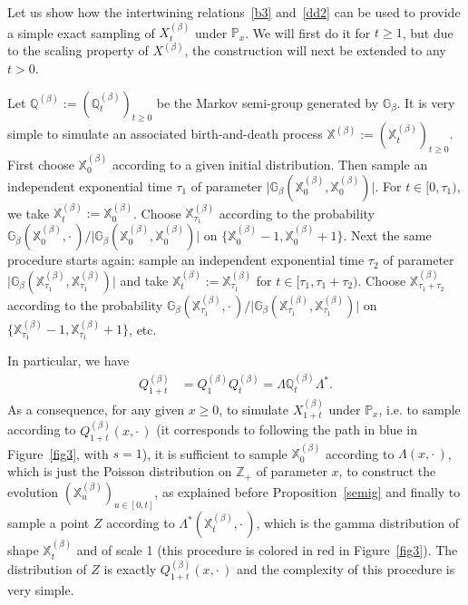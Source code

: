 \documentclass[AHL,Unicode,longabstracts]{cedram}
\newcommand{\df}{\mathrel{:=}}
\newcommand{\cX}{{\discret X}}
\newcommand{\PP}{\mathbb{P}}
\newcommand{\ZZ}{\mathbb{Z}}
\newcommand{\dBg}{{\discret{G}}}
\newcommand{\dBs}{{\discret{Q}}}
\newcommand{\Bs}{Q}
\newcommand{\discret}[1]{\mathds{#1}}
\newcommand{\adjL}{\Lambda^*}
\begin{document}
Let us show how the intertwining relations~\eqref{b3} and~\eqref{dd2} can be used to provide a simple exact sampling of $X^{(\beta)}_t$ under $\PP_x$. We will first do it for $t\geq 1$, but due to the scaling property of $X^{(\beta)}$, the construction will next be extended to any $t>0$.

Let $\dBs^{(\beta)}\df(\dBs^{(\beta)}_t)_{t\geq 0}$ be the Markov semi-group generated by $\dBg_{\beta}$. It is very simple to simulate an associated birth-and-death process $\cX^{(\beta)}\df(\cX_t^{(\beta)})_{t\geq 0}$. First choose $\cX_0^{(\beta)}$ according to a given initial distribution. Then sample an independent exponential time $\tau_1$ of parameter $\vert \dBg_{\beta}(\cX^{(\beta)}_0,\cX^{(\beta)}_0)\vert$. For $t\in[0,\tau_1)$, we take $\cX^{(\beta)}_t\df \cX^{(\beta)}_0$. Choose $\cX^{(\beta)}_{\tau_1}$ according to the probability $\dBg_{\beta}(\cX^{(\beta)}_0,{\cdot\,})/\vert \dBg_{\beta}(\cX^{(\beta)}_0,\cX^{(\beta)}_0)\vert$ on $\{\cX^{(\beta)}_0-1, \cX^{(\beta)}_0+1\}$. Next the same procedure starts again: sample an independent exponential time $\tau_2$ of parameter $\vert \dBg_{\beta}(\cX^{(\beta)}_{\tau_1},\cX^{(\beta)}_{\tau_1})\vert$ and take $\cX^{(\beta)}_t\df \cX^{(\beta)}_{\tau_1}$ for $t\in[\tau_1,\tau_1+\tau_2)$. Choose $\cX^{(\beta)}_{\tau_1+\tau_2}$ according to the probability $\dBg_{\beta}(\cX^{(\beta)}_{\tau_1},{\cdot\,})/\vert \dBg_{\beta}(\cX^{(\beta)}_{\tau_1},\cX^{(\beta)}_{\tau_1})\vert$ on $\{\cX^{(\beta)}_{\tau_1}-1, \cX^{(\beta)}_{\tau_1}+1\}$, etc.

In particular, we have
\begin{align*}
\Bs^{(\beta)}_{1+t}&=\Bs^{(\beta)}_{1}\Bs^{(\beta)}_{t}=\Lambda \dBs^{(\beta)}_t\adjL.
\end{align*}
As a consequence, for any given $x\geq 0$, to simulate $X^{(\beta)}_{1+t}$ under $\PP_x$, i.e. to sample according to $\Bs^{(\beta)}_{1+t}(x,{\cdot\,})$ (it corresponds to following the path in blue in Figure~\ref{fig3}, with $s=1$), it is sufficient to sample $\cX_0^{(\beta)}$ according to $\Lambda(x,{\cdot\,})$, which is just the Poisson distribution on $\ZZ_+$ of parameter $x$, to construct the evolution $(\cX^{(\beta)}_u)_{u\in[0,t]}$, as explained before Proposition~\ref{semig} and finally to sample a point $Z$ according to $\adjL (\cX^{(\beta)}_t,{\cdot\,})$, which is the gamma distribution of shape $\cX^{(\beta)}_t$ and of scale 1 (this procedure is colored in red in Figure~\ref{fig3}). The distribution of $Z$ is exactly $\Bs^{(\beta)}_{1+t}(x,{\cdot\,})$ and the complexity of this procedure is very simple.
\end{document}
